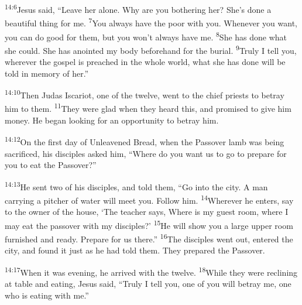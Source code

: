 \documentclass[openany,12pt,english]{book}
\newenvironment{para}{\par\pretolerance=100\tolerance=200\setlength{\emergencystretch}{0.6em}\relax}{\par}
\begin{document}
\begin{para}
    \textsuperscript{14:6}\thinspace{}Jesus said, “Leave her a\-lone. Why are you bothering her? She's done a beau\-ti\-ful thing for me.
    \textsuperscript{7}\thinspace{}You al\-ways have the poor with you. When\-ev\-er you want, you can do good for them, but you won't al\-ways have me.
    \textsuperscript{8}\thinspace{}She has done what she could. She has anointed my bod\-y be\-fore\-hand for the bur\-i\-al.
    \textsuperscript{9}\thinspace{}Tru\-ly I tell you, wher\-ev\-er the gos\-pel is preached in the whole world, what she has done will be told in mem\-o\-ry of her.”
\end{para}

\begin{para}
    \textsuperscript{14:10}\thinspace{}Then Ju\-das Iscariot, one of the twelve, went to the chief priests to be\-tray him to them.
    \textsuperscript{11}\thinspace{}They were glad when they heard this, and prom\-ised to give him mon\-ey. He be\-gan looking for an op\-por\-tu\-ni\-ty to be\-tray him.
\end{para}

\bigskip{}

\begin{para}
    \textsuperscript{14:12}\thinspace{}On the first day of Un\-leav\-ened Bread, when the Passover lamb was be\-ing sacrificed, his disciples asked him, “Where do you want us to go to pre\-pare for you to eat the Passover?”
\end{para}

\begin{para}
    \textsuperscript{14:13}\thinspace{}He sent two of his disciples, and told them, “Go in\-to the cit\-y. A man car\-ry\-ing a pitch\-er of wa\-ter will meet you. Fol\-low him.
    \textsuperscript{14}\thinspace{}Wher\-ev\-er he enters, say to the own\-er of the house, ‘The teach\-er says, Where is my guest room, where I may eat the passover with my disciples?’
    \textsuperscript{15}\thinspace{}He will show you a large up\-per room furnished and read\-y. Pre\-pare for us there.”
    \textsuperscript{16}\thinspace{}The disciples went out, entered the cit\-y, and found it just as he had told them. They pre\-pared the Passover.
\end{para}

\begin{para}
    \textsuperscript{14:17}\thinspace{}When it was eve\-ning, he ar\-rived with the twelve.
    \textsuperscript{18}\thinspace{}While they were re\-clin\-ing at ta\-ble and eat\-ing, Jesus said, “Tru\-ly I tell you, one of you will be\-tray me, one who is eat\-ing with me.”
\end{para}
\end{document}
